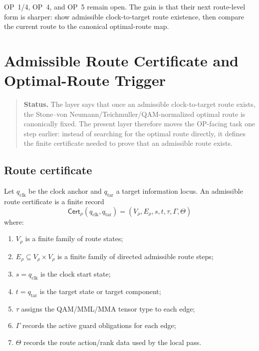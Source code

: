 \begin{remark}
\label{rem:v410r10-op-status}
OP~1/4, OP~4, and OP~5 remain open. The gain is that their next route-level
form is sharper: show admissible clock-to-target route existence, then compare
the current route to the canonical optimal-route map.
\end{remark}



\clearpage
\section{Admissible Route Certificate and Optimal-Route Trigger}
\label{sec:v410r11-admissible-route-certificate-optimal-route-trigger}

\begin{quote}\small
\noindent\textbf{Status.}
The layer says that once an admissible clock-to-target route exists, the
Stone--von Neumann/Teichmuller/QAM-normalized optimal route is canonically
fixed. The present layer therefore moves the OP-facing task one step
earlier: instead of searching for the optimal route directly, it defines the
finite certificate needed to prove that an admissible route exists.
\end{quote}

\subsection{Route certificate}
\label{subsec:v410r11-route-certificate}

\begin{definition}
\label{def:v410r11-admissible-route-certificate}
Let \(q_{\mathrm{clk}}\) be the clock anchor and \(q_{\mathrm{tar}}\) a target
information locus. An admissible route certificate is a finite record
\[
 \mathsf{Cert}_{\rho}(q_{\mathrm{clk}},q_{\mathrm{tar}})
 =
 (V_{\rho},E_{\rho},s,t,\tau,\Gamma,\Theta)
\]
where:
\begin{enumerate}[leftmargin=*]
 \item \(V_{\rho}\) is a finite family of route states;
 \item \(E_{\rho}\subseteq V_{\rho}\times V_{\rho}\) is a finite family of
 directed admissible route steps;
 \item \(s=q_{\mathrm{clk}}\) is the clock start state;
 \item \(t=q_{\mathrm{tar}}\) is the target state or target component;
 \item \(\tau\) assigns the QAM/MML/MMA tensor type to each edge;
 \item \(\Gamma\) records the active guard obligations for each edge;
 \item \(\Theta\) records the route action/rank data used by the local pass.
\end{enumerate}
\end{definition}


